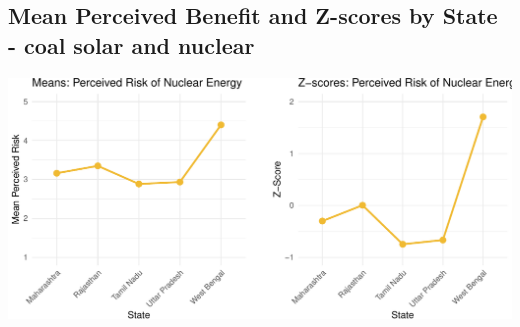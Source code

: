 \documentclass[
]{article}
\begin{document}
\newpage

\hypertarget{mean-perceived-benefit-and-z-scores-by-state---coal-solar-and-nuclear}{%
\subsection{Mean Perceived Benefit and Z-scores by State - coal solar
and
nuclear}\label{mean-perceived-benefit-and-z-scores-by-state---coal-solar-and-nuclear}}

\includegraphics{nuclear-in-comparison_files/figure-latex/unnamed-chunk-38-1.pdf}

\newpage
\end{document}
